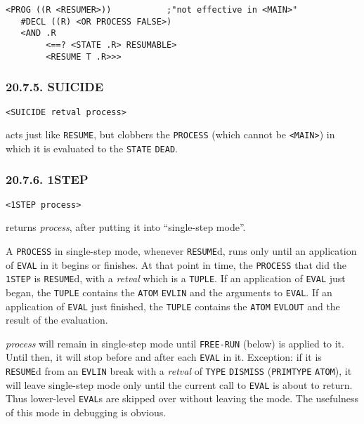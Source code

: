 \documentclass[a4paper,]{article}
\begin{document}
\begin{verbatim}
<PROG ((R <RESUMER>))           ;"not effective in <MAIN>"
   #DECL ((R) <OR PROCESS FALSE>)
   <AND .R
        <==? <STATE .R> RESUMABLE>
        <RESUME T .R>>>
\end{verbatim}

\subsubsection{20.7.5. SUICIDE}\label{suicide}

\begin{verbatim}
<SUICIDE retval process>
\end{verbatim}

 acts just like \texttt{RESUME}, but clobbers the \texttt{PROCESS} (which cannot be
\texttt{\textless{}MAIN\textgreater{}}) in which it is evaluated to the \texttt{STATE} \texttt{DEAD}.

\subsubsection{20.7.6. 1STEP}\label{step}

\begin{verbatim}
<1STEP process>
\end{verbatim}

 returns \emph{process}, after putting it into ``single-step mode''.

A \texttt{PROCESS} in single-step mode, whenever \texttt{RESUME}d, runs only until an application of
\texttt{EVAL} in it begins or finishes. At that point in time, the \texttt{PROCESS} that did the
\texttt{1STEP} is \texttt{RESUME}d, with a \emph{retval} which is a \texttt{TUPLE}. If an application of \texttt{EVAL} just
began, the \texttt{TUPLE} contains the \texttt{ATOM} \texttt{EVLIN} and the arguments to
\texttt{EVAL}. If an application of \texttt{EVAL} just finished, the \texttt{TUPLE} contains the \texttt{ATOM}
\texttt{EVLOUT} and the result of the evaluation.

\emph{process} will remain in single-step mode until \texttt{FREE-RUN} (below) is applied to it. Until then, it will stop
before and after each \texttt{EVAL} in it. Exception: if it is \texttt{RESUME}d from an \texttt{EVLIN} break with a
\emph{retval} of \texttt{TYPE} \texttt{DISMISS} (\texttt{PRIMTYPE} \texttt{ATOM}), it will
leave single-step mode only until the current call to \texttt{EVAL} is about to return. Thus lower-level \texttt{EVAL}s are
skipped over without leaving the mode. The usefulness of this mode in debugging is obvious.
\end{document}
